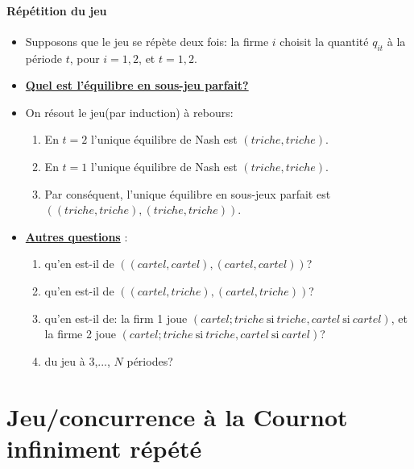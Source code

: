 \begin{frame}[allowframebreaks]{\insertsection}
\framesubtitle{Répétition du jeu}
    \begin{itemize}
        \item Supposons que le jeu se répète deux fois: la firme $i$ choisit 
        la quantité $q_{it}$ à la période $t$, pour $i=1, 2$, et $t=1, 2$.
        \item \textbf{\underline{Quel est l'équilibre en sous-jeu parfait?}} 
        \item On résout le jeu(par induction) à rebours:
        \begin{enumerate}[-]
            \item En $t=2$ l'unique équilibre de Nash est $(triche, triche)$.
            \item En $t=1$ l'unique équilibre de Nash est $(triche, triche)$.
            \item Par conséquent, l'unique équilibre en sous-jeux parfait est $\left( 
                (triche, triche), (triche, triche)
            \right)$.
        \end{enumerate}
        \item \textbf{\underline{Autres questions}} : 
        \begin{enumerate}[-]
         \item qu'en est-il de $\left((cartel,cartel), (cartel,cartel)\right)$? 
         \item qu'en est-il de $\left((cartel, triche), (cartel, triche)\right)$?
         \item qu'en est-il de: la firm 1 joue $(cartel; triche \ \text{si} \ triche, cartel  \ \text{si} \ cartel)$,
          et la firme 2 joue $(cartel; triche \ \text{si} \ triche, cartel  \ \text{si} \ cartel)$?
        \item du jeu à 3,..., $N$ périodes?
\end{enumerate}
\end{itemize}
\end{frame}

\section{Jeu/concurrence à la Cournot infiniment répété}
\frame{\sectionpage}

